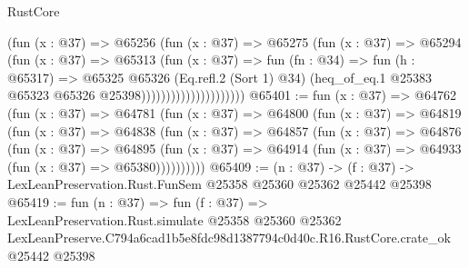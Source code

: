 \begin{lexlean}{RustCore}
\begin{coremodule}
                                  (fun (x : @37) =>
                                  @65256
                                    (fun (x : @37) =>
                                    @65275
                                      (fun (x : @37) =>
                                      @65294
                                        (fun (x : @37) =>
                                        @65313
                                          (fun (x : @37) =>
                                          fun (fn : @34) =>
                                          fun (h : @65317) =>
                                          @65325
                                            @65326
                                            (Eq.refl.{2} (Sort 1) @34)
                                            (heq_of_eq.{1}
                                              @25383
                                              @65323
                                              @65326
                                              @25398)))))))))))))))))))))
@65401 := fun (x : @37) =>
  @64762
    (fun (x : @37) =>
    @64781
      (fun (x : @37) =>
      @64800
        (fun (x : @37) =>
        @64819
          (fun (x : @37) =>
          @64838
            (fun (x : @37) =>
            @64857
              (fun (x : @37) =>
              @64876
                (fun (x : @37) =>
                @64895
                  (fun (x : @37) =>
                  @64914 (fun (x : @37) => @64933 (fun (x : @37) => @65380))))))))))
@65409 := (n : @37) ->
  (f : @37) -> LexLeanPreservation.Rust.FunSem @25358 @25360 @25362 @25442 @25398
@65419 := fun (n : @37) =>
  fun (f : @37) =>
  LexLeanPreservation.Rust.simulate
    @25358
    @25360
    @25362
    LexLeanPreserve.C794a6cad1b5e8fdc98d1387794c0d40c.R16.RustCore.crate_ok
    @25442
    @25398
\end{coremodule}
\end{lexlean}
